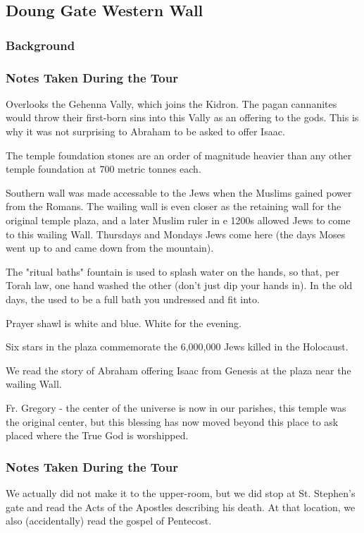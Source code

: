 \documentclass[letterpaper]{report}
\begin{document}
\subsection{Doung Gate Western Wall}
\begin{multicols}{2}
\subsubsection{Background}
\subsubsection{Notes Taken During the Tour}
Overlooks the Gehenna Vally, which joins the Kidron. The pagan cannanites would throw their first-born sins into this Vally as an offering to the gods. This is why it was not surprising to Abraham to be asked to offer Isaac.

The temple foundation stones are an order of magnitude heavier than any other temple foundation at 700 metric tonnes each.

Southern wall was made accessable to the Jews when the Muslims gained power from the Romans. The wailing wall is even closer as the retaining wall for the original temple plaza, and a later Muslim ruler in e 1200s allowed Jews to come to this wailing Wall.
Thursdays and Mondays Jews come here (the days Moses went up to and came down from the mountain).

The "ritual baths" fountain is used to splash water on the hands, so that, per Torah law, one hand washed the other (don't just dip your hands in). In the old days, the used to be a full bath you undressed and fit into.

Prayer shawl is white and blue. White for the evening.

Six stars in the plaza commemorate the 6,000,000 Jews killed in the Holocaust.

We read the story of Abraham offering Isaac from Genesis at the plaza near the wailing Wall.

Fr. Gregory - the center of the universe is now in our parishes, this temple was the original center, but this blessing has now moved beyond this place to ask placed where the True God is worshipped.

\end{multicols}



\subsubsection{Notes Taken During the Tour}
We actually did not make it to the upper-room,
but we did stop at St. Stephen's gate and read the Acts of the Apostles describing his death.
At that location, we also (accidentally) read the gospel of Pentecost.
\end{document}
